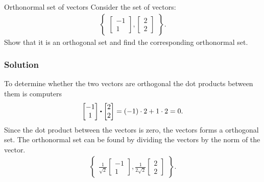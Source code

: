 \begin{example}{Orthonormal set of vectors}
    Consider the set of vectors:
    \begin{align*}
    \begin{Bmatrix}
    \begin{bmatrix}
        -1\\1
    \end{bmatrix},
    \begin{bmatrix}
        2\\2
    \end{bmatrix}
    \end{Bmatrix}.
    \end{align*}
    Show that it is an orthogonal set and find the corresponding orthonormal set.
    \subsubsection{Solution}
    To determine whether the two vectors are orthogonal the dot products between them is computers 
    \begin{align*}
    \begin{bmatrix}
        -1\\1
    \end{bmatrix}\vprik
    \begin{bmatrix}
        2\\2
    \end{bmatrix}=(-1)\cdot2+1\cdot2=0.
    \end{align*}
    Since the dot product between the vectors is zero, the vectors forms a orthogonal set. The orthonormal set can be found by dividing the vectors by the norm of the vector. 
    \begin{align*}
    \begin{Bmatrix}
    \frac{1}{\sqrt{2}}
    \begin{bmatrix}
        -1\\1
    \end{bmatrix},
    \frac{1}{2\sqrt{2}}
    \begin{bmatrix}
        2\\2
    \end{bmatrix}
    \end{Bmatrix}.
    \end{align*}
\end{example}

